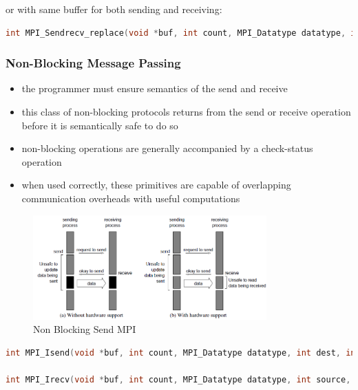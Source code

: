 or with same buffer for both sending and receiving:

\begin{lstlisting}[language=C++]
int MPI_Sendrecv_replace(void *buf, int count, MPI_Datatype datatype, int dest, int sendtag, int source, int recvtag, MPI_Comm comm, MPI_Status *status)
\end{lstlisting}

\hypertarget{non-blocking-message-passing}{%
\subsubsection{Non-Blocking Message
Passing}\label{non-blocking-message-passing}}

\begin{itemize}
\tightlist
\item
  the programmer must ensure semantics of the send and receive
\item
  this class of non-blocking protocols returns from the send or receive
  operation before it is semantically safe to do so
\item
  non-blocking operations are generally accompanied by a check-status
  operation
\item
  when used correctly, these primitives are capable of overlapping
  communication overheads with useful computations
\end{itemize}

\begin{figure}[H]
\centering
\includegraphics[width=0.8\textwidth]{figures/non-blockingSendMPI.png}
\caption{Non Blocking Send MPI}
\end{figure}

\begin{lstlisting}[language=C++]
int MPI_Isend(void *buf, int count, MPI_Datatype datatype, int dest, int tag, MPI_Comm comm, MPI_Request *request)

int MPI_Irecv(void *buf, int count, MPI_Datatype datatype, int source, int tag, MPI_Comm comm, MPI_Request *request)
\end{lstlisting}

